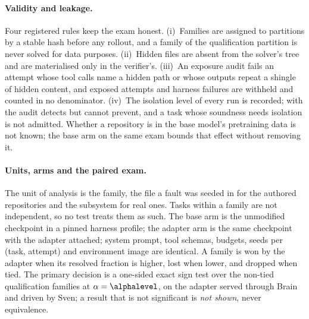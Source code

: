\paragraph{Validity and leakage.} Four registered rules keep the exam honest. (i)~Families are
assigned to partitions by a stable hash before any rollout, and a family of the qualification
partition is never solved for data purposes. (ii)~Hidden files are absent from the
solver's tree and are materialised only in the verifier's. (iii)~An exposure audit fails
an attempt whose tool calls name a hidden path or whose outputs repeat a shingle of hidden
content, and exposed attempts and harness failures are withheld and counted in no
denominator. (iv)~The isolation level of every run is recorded; with
 the audit detects but cannot prevent, and a task whose soundness needs
isolation is not admitted. Whether a repository is in the base model's
pretraining data is not known; the base arm on the same exam bounds that effect without
removing it.

\paragraph{Units, arms and the paired exam.} The unit of analysis is the family, the file a
fault was seeded in for the authored repositories and the subsystem for real
ones. Tasks within a family are not independent, so no test treats them as such. The
base arm is the unmodified checkpoint in a pinned harness profile; the adapter arm is the same
checkpoint with the adapter attached; system prompt, tool schemas, budgets, seeds per
(task, attempt) and environment image are identical. A family is won by the adapter
when its resolved fraction is higher, lost when lower, and dropped when tied. The primary
decision is a one-sided exact sign test over the non-tied qualification families at
$\alpha=\alphalevel$, on the adapter served through Brain and driven by Sven; a result that is
not significant is \emph{not shown}, never equivalence.

\begin{table}[t]
\centering\small

\caption{The exact one-sided sign test at $\alpha=\alphalevel$: wins required and power if
each non-tied family is a win with the stated probability (a design calculation computed by
, not a measurement).}\label{tab:design}
\end{table}


